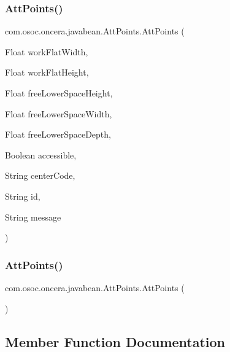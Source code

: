 \subsubsection{\texorpdfstring{AttPoints()}{AttPoints()}\hspace{0.1cm}{\footnotesize\ttfamily [1/2]}}
{\footnotesize\ttfamily com.\+osoc.\+oncera.\+javabean.\+Att\+Points.\+Att\+Points (\begin{DoxyParamCaption}\item[{Float}]{work\+Flat\+Width,  }\item[{Float}]{work\+Flat\+Height,  }\item[{Float}]{free\+Lower\+Space\+Height,  }\item[{Float}]{free\+Lower\+Space\+Width,  }\item[{Float}]{free\+Lower\+Space\+Depth,  }\item[{Boolean}]{accessible,  }\item[{String}]{center\+Code,  }\item[{String}]{id,  }\item[{String}]{message }\end{DoxyParamCaption})}

\mbox{\label{classcom_1_1osoc_1_1oncera_1_1javabean_1_1_att_points_a0e9d467cf48437ca8977e6f81696567f}} 
\subsubsection{\texorpdfstring{AttPoints()}{AttPoints()}\hspace{0.1cm}{\footnotesize\ttfamily [2/2]}}
{\footnotesize\ttfamily com.\+osoc.\+oncera.\+javabean.\+Att\+Points.\+Att\+Points (\begin{DoxyParamCaption}{ }\end{DoxyParamCaption})}



\subsection{Member Function Documentation}
\mbox{\label{classcom_1_1osoc_1_1oncera_1_1javabean_1_1_att_points_a3a4c0eb25b4b6a2335d1bee1e98913cd}} 
